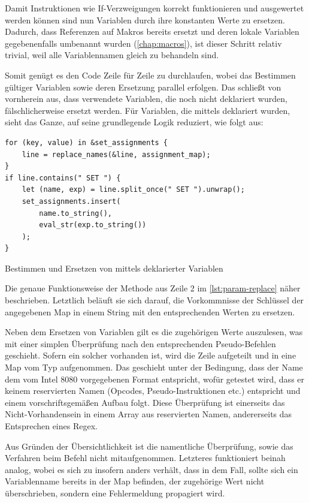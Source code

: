 Damit Instruktionen wie If-Verzweigungen korrekt funktionieren und ausgewertet werden können sind nun Variablen durch ihre konstanten Werte zu ersetzen. Dadurch, dass Referenzen auf Makros bereits ersetzt und deren lokale Variablen gegebenenfalls umbenannt wurden (\ref{chap:macros}), ist dieser Schritt relativ trivial, weil alle Variablennamen gleich zu behandeln sind.

Somit genügt es den Code Zeile für Zeile zu durchlaufen, wobei das Bestimmen gültiger Variablen sowie deren Ersetzung parallel erfolgen. Das schließt von vornherein aus, dass verwendete Variablen, die noch nicht deklariert wurden, fälschlicherweise ersetzt werden. Für Variablen, die mittels  deklariert wurden, sieht das Ganze, auf seine grundlegende Logik reduziert, wie folgt aus:

\begin{listing}[th]
\begin{verbatim}
for (key, value) in &set_assignments {
    line = replace_names(&line, assignment_map);
}
if line.contains(" SET ") {
    let (name, exp) = line.split_once(" SET ").unwrap();
    set_assignments.insert(
        name.to_string(),
        eval_str(exp.to_string())
    );
}
\end{verbatim}
\label{lst:var-replacement}
\caption{Bestimmen und Ersetzen von mittels  deklarierter Variablen}
\end{listing}

Die genaue Funktionsweise der Methode  aus Zeile 2 im \cref{lst:param-replace} näher beschrieben. Letztlich beläuft sie sich darauf, die Vorkommnisse der Schlüssel der angegebenen Map in einem String mit den entsprechenden Werten zu ersetzen.

Neben dem Ersetzen von Variablen gilt es die zugehörigen Werte auszulesen, was mit einer simplen Überprüfung nach den entsprechenden Pseudo-Befehlen geschieht. Sofern ein solcher vorhanden ist, wird die Zeile aufgeteilt und in eine Map vom Typ  aufgenommen. Das geschieht unter der Bedingung, dass der Name dem vom Intel 8080 vorgegebenen Format entspricht, wofür getestet wird, dass er keinem reservierten Namen (Opcodes, Pseudo-Instruktionen etc.) entspricht und einem vorschriftsgemäßen Aufbau folgt. Diese Überprüfung ist einerseits das Nicht-Vorhandensein in einem Array aus reservierten Namen, andererseits das Entsprechen eines Regex.

Aus Gründen der Übersichtlichkeit ist die namentliche Überprüfung, sowie das Verfahren beim Befehl  nicht mitaufgenommen. Letzteres funktioniert beinah analog, wobei es sich zu  insofern anders verhält, dass in dem Fall, sollte sich ein Variablenname bereits in der Map befinden, der zugehörige Wert nicht überschrieben, sondern eine Fehlermeldung propagiert wird.

